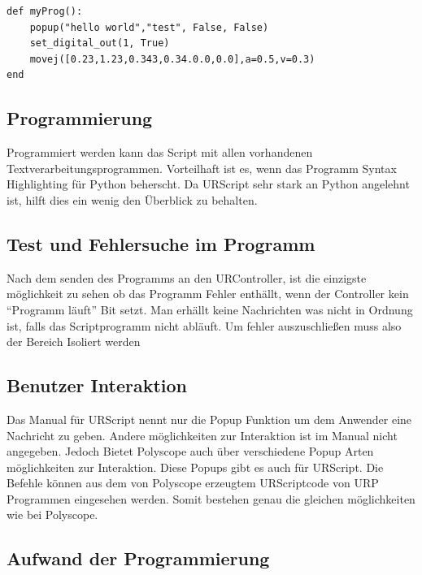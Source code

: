 \begin{lstlisting}[caption={Kleines Beispielprogram in URScript}, label=lst:urscipt_program_lst ,captionpos=b] 
def myProg():
	popup("hello world","test", False, False)
	set_digital_out(1, True)
	movej([0.23,1.23,0.343,0.34.0.0,0.0],a=0.5,v=0.3)
end
\end{lstlisting}

\subsection{Programmierung}
\label{programmierung_ur_script_rel}

Programmiert werden kann das Script mit allen vorhandenen Textverarbeitungsprogrammen. Vorteilhaft ist es, wenn das Programm \ac{Syntax Highlighting} für Python beherscht. Da URScript sehr stark an Python angelehnt ist, hilft dies ein wenig den Überblick zu behalten.

\subsection{Test und Fehlersuche im Programm}
\label{ur_script_debuggen}

Nach dem senden des Programms an den URController, ist die einzigste möglichkeit zu sehen ob das Programm Fehler enthällt, wenn der Controller kein ``Programm läuft'' Bit setzt. Man erhällt keine Nachrichten was nicht in Ordnung ist, falls das Scriptprogramm nicht abläuft. Um fehler auszuschließen muss also der Bereich Isoliert werden

\subsection{Benutzer Interaktion}
\label{ur_script_user_interaction}

Das Manual für URScript nennt nur die \ac{Popup} Funktion um dem Anwender eine Nachricht zu geben. Andere möglichkeiten zur Interaktion ist im Manual nicht angegeben. Jedoch Bietet Polyscope auch über verschiedene \ac{Popup} Arten möglichkeiten zur Interaktion. Diese \ac{Popup}s gibt es auch für URScript. Die Befehle können aus dem von Polyscope erzeugtem URScriptcode von \ac{URP} Programmen eingesehen werden. Somit bestehen genau die gleichen möglichkeiten wie bei Polyscope.

\subsection{Aufwand der Programmierung}
\label{ur_script_aufwand}

